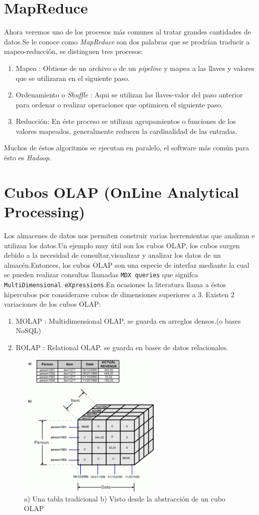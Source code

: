 \section{MapReduce}

Ahora veremos uno de los procesos más comunes al tratar grandes cantidades de datos.Se le conoce como \textit{MapReduce} son dos palabras que se prodrían traducir a mapeo-reducción, se distinguen tres procesos:
\begin{enumerate}
\item Mapeo : Obtiene de un archivo o de un \textit{pipeline} y mapea a las llaves y valores que se utilizaran en el siguiente paso.
\item Ordenamiento o \textit{Shuffle} : Aqui se utilizan las llaves-valor del paso anterior para ordenar o realizar operaciones que optimicen el siguiente paso.
\item Reducción: En éste proceso se utilizan agrupamientos o funciones de los valores mapeados, generalmente reducen la cardinalidad de las entradas.
\end{enumerate}
Muchos de éstos algoritmos se ejecutan en paralelo, el software más común para ésto es \textit{Hadoop}.

\section{Cubos OLAP (OnLine Analytical Processing)}
Los almacenes de datos nos permiten construir varias herremientas que analizan e utilizan los datos.Un ejemplo muy útil son los cubos OLAP, los cubos surgen debido a la necesidad de consultar,visualizar y analizar los datos de un almacén.Entonces, los cubos OLAP son una especie de interfaz mediante la cual se pueden realizar consultas llamadas \verb#MDX queries# que signifca \verb#MultiDimensional eXpressions#.En ocasiones la literatura llama a éstos hipercubos por considerarse cubos de dimensiones superiores a 3.
Existen 2 variaciones de los cubos OLAP:
\begin{enumerate}
\item MOLAP : Multidimensional OLAP, se guarda en arreglos densos.(o bases NoSQL)
\item ROLAP : Relational OLAP. se guarda en bases de datos relacionales.
\end{enumerate}
\begin{figure}[h]
\centering
\includegraphics[width=7cm, height=7cm]{OLAP-vs-Table.png}
\caption{a) Una tabla tradicional b) Visto desde la abstracción de un cubo OLAP}
\label{fig:my_label}
\end{figure}

